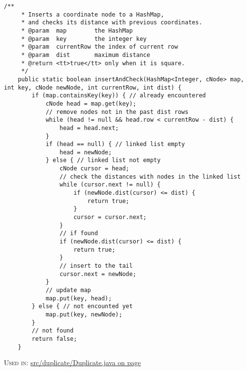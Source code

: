 \begin{lstlisting}[title={<HashMap Insertion 6>}, label=Listing6]
    /**
     * Inserts a coordinate node to a HashMap, 
     * and checks its distance with previous coordinates.
     * @param  map        the HashMap
     * @param  key        the integer key
     * @param  currentRow the index of current row
     * @param  dist       maximum distance
     * @return <tt>true</tt> only when it is square.
     */
    public static boolean insertAndCheck(HashMap<Integer, cNode> map, int key, cNode newNode, int currentRow, int dist) {
        if (map.containsKey(key)) { // already encountered
            cNode head = map.get(key);
            // remove nodes not in the past dist rows
            while (head != null && head.row < currentRow - dist) {
                head = head.next;
            }
            if (head == null) { // linked list empty
                head = newNode;
            } else { // linked list not empty
                cNode cursor = head;
                // check the distances with nodes in the linked list
                while (cursor.next != null) {
                    if (newNode.dist(cursor) <= dist) {
                        return true;
                    }
                    cursor = cursor.next;
                }
                // if found
                if (newNode.dist(cursor) <= dist) {
                    return true;
                }
                // insert to the tail
                cursor.next = newNode;
            }
            // update map
            map.put(key, head);
        } else { // not encounted yet
            map.put(key, newNode);
        }
        // not found
        return false;
    }
\end{lstlisting}\begin{footnotesize} \textsc{Used in}: \hyperref[Listing1]{s\-r\-c\-/\-d\-u\-p\-l\-i\-c\-a\-t\-e\-/\-D\-u\-p\-l\-i\-c\-a\-t\-e\-.\-j\-a\-v\-a on page} \pageref{Listing1}  \end{footnotesize}\vskip 5mm\noindent
